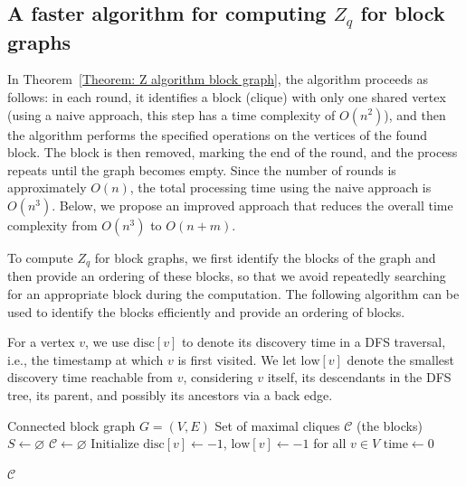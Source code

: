 \documentclass[11pt]{article}
\theoremstyle{plain}
\theoremstyle{definition}
\theoremstyle{remark}
\begin{document}
\subsection{A faster algorithm for computing \texorpdfstring{\(Z_q\)}{Zq} for block graphs} \label{apx: faster zq block graphs}

In Theorem~\ref{Theorem: Z algorithm block graph}, the algorithm proceeds as follows: in each round, it identifies a block (clique) with only one shared vertex (using a naive approach, this step has a time complexity of $O(n^2)$), and then the algorithm performs the specified operations on the vertices of the found block. The block is then removed, marking the end of the round, and the process repeats until the graph becomes empty. Since the number of rounds is approximately $O(n)$, the total processing time using the naive approach is $O(n^3)$. Below, we propose an improved approach that reduces the overall time complexity from $O(n^3)$ to $O(n+m)$.

To compute $Z_q$ for block graphs, we first identify the blocks of the graph and then provide an ordering of these blocks, so that we avoid repeatedly searching for an appropriate block during the computation. The following algorithm can be used to identify the blocks efficiently and provide an ordering of blocks.

For a vertex $v$, we use $\mathrm{disc}[v]$ to denote its discovery time in a DFS traversal, i.e., the timestamp at which $v$ is first visited. We let $\mathrm{low}[v]$ denote the smallest discovery time reachable from $v$, considering $v$ itself, its descendants in the DFS tree, its parent, and possibly its ancestors via a back edge.

\begin{algorithm}[H]
\caption{Find-Blocks($G$)}
\label{alg:find-cliques}
\begin{algorithmic}[1]
\Require Connected block graph $G = (V,E)$
\Ensure Set of maximal cliques $\mathcal{C}$ (the blocks)
\State $S \gets \varnothing $ 
\State $\mathcal{C} \gets \varnothing$ 
\State Initialize $\text{disc}[v] \gets -1$, $\text{low}[v] \gets -1$ for all $v \in V$
\State $\text{time} \gets 0$
\State {} 

\State \Return $\mathcal{C}$
\end{algorithmic}
\end{algorithm}
\end{document}
